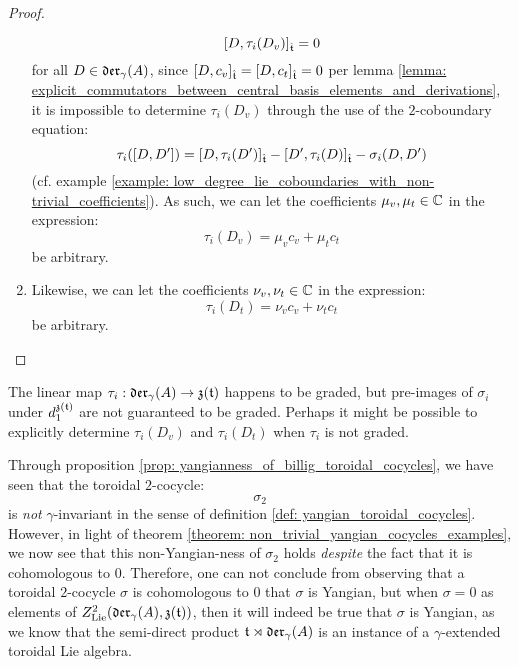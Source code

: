\begin{proof}
\begin{enumerate}
                        $$[D, \tau_i(D_v)]_{\hat{\mathfrak{t}}} = 0$$
                    for all $D \in \mathfrak{der}_{\gamma}(A)$, since $[D, c_v]_{\hat{\mathfrak{t}}} = [D, c_t]_{\hat{\mathfrak{t}}} = 0$ per lemma \ref{lemma: explicit_commutators_between_central_basis_elements_and_derivations}, it is impossible to determine $\tau_i(D_v)$ through the use of the $2$-coboundary equation:
                        $$\tau_i([D, D']) = [D, \tau_i(D')]_{\hat{\mathfrak{t}}} - [D', \tau_i(D)]_{\hat{\mathfrak{t}}} - \sigma_i(D, D')$$
                    (cf. example \ref{example: low_degree_lie_coboundaries_with_non-trivial_coefficients}). As such, we can let the coefficients $\mu_v, \mu_t \in \mathbb{C}$ in the expression:
                        $$\tau_i(D_v) = \mu_v c_v + \mu_t c_t$$
                    be arbitrary.
                    \item Likewise, we can let the coefficients $\nu_v, \nu_t \in \mathbb{C}$ in the expression:
                        $$\tau_i(D_t) = \nu_v c_v + \nu_t c_t$$
                    be arbitrary.
                \end{enumerate}
            \end{proof}
        \begin{remark}
            The linear map $\tau_i: \mathfrak{der}_{\gamma}(A) \to \mathfrak{z}(\mathfrak{t})$ happens to be graded, but pre-images of $\sigma_i$ under $d_1^{\mathfrak{z}(\mathfrak{t})}$ are not guaranteed to be graded. Perhaps it might be possible to explicitly determine $\tau_i(D_v)$ and $\tau_i(D_t)$ when $\tau_i$ is not graded.
        \end{remark}
        \begin{remark}
            Through proposition \ref{prop: yangianness_of_billig_toroidal_cocycles}, we have seen that the toroidal $2$-cocycle:
                $$\sigma_2$$
            is \textit{not} $\gamma$-invariant in the sense of definition \ref{def: yangian_toroidal_cocycles}. However, in light of theorem \ref{theorem: non_trivial_yangian_cocycles_examples}, we now see that this non-Yangian-ness of $\sigma_2$ holds \textit{despite} the fact that it is cohomologous to $0$. Therefore, one can not conclude from observing that a toroidal $2$-cocycle $\sigma$ is cohomologous to $0$ that $\sigma$ is Yangian, but when $\sigma = 0$ as elements of $Z^2_{\mathrm{Lie}}(\mathfrak{der}_{\gamma}(A), \mathfrak{z}(\mathfrak{t}))$, then it will indeed be true that $\sigma$ is Yangian, as we know that the semi-direct product $\mathfrak{t} \rtimes \mathfrak{der}_{\gamma}(A)$ is an instance of a $\gamma$-extended toroidal Lie algebra.
        \end{remark}